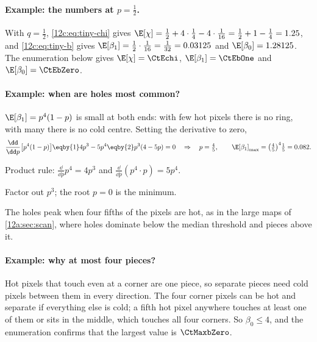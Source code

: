 \paragraph{Example: the numbers at $p=\tfrac12$.} With $q=\tfrac12$, \eqref{12c:eq:tiny-chi} gives
$\E[\chi]=\tfrac12+4\cdot\tfrac14-4\cdot\tfrac1{16}=\tfrac12+1-\tfrac14=1.25$, and \eqref{12c:eq:tiny-b} gives
$\E[\beta_1]=\tfrac12\cdot\tfrac1{16}=\tfrac1{32}=0.03125$ and $\E[\beta_0]=1.28125$. The enumeration below gives
$\E[\chi]=\CtEchi$, $\E[\beta_1]=\CtEbOne$ and $\E[\beta_0]=\CtEbZero$.

\paragraph{Example: when are holes most common?} $\E[\beta_1]=p^4(1-p)$ is small at both ends: with few hot pixels
there is no ring, with many there is no cold centre. Setting the derivative to zero,
\begin{align*}
  \frac{\dd}{\dd p}\bigl[p^4(1-p)\bigr]
  \eqby{1}4p^3-5p^4
  \eqby{2}p^3(4-5p)=0
  \quad\Rightarrow\quad p=\tfrac45,\qquad \E[\beta_1]_{\max}=\bigl(\tfrac45\bigr)^4\tfrac15=0.082 .
\end{align*}
\begin{explain}
  \item Product rule: $\frac{\dd}{\dd p}p^4=4p^3$ and $\frac{\dd}{\dd p}(p^4\cdot p)=5p^4$.
  \item Factor out $p^3$; the root $p=0$ is the minimum.
\end{explain}
The holes peak when four fifths of the pixels are hot, as in the large maps of \cref{12a:sec:scan}, where holes
dominate below the median threshold and pieces above it.

\paragraph{Example: why at most four pieces?} Hot pixels that touch even at a corner are one piece, so separate pieces
need cold pixels between them in every direction. The four corner pixels can be hot and separate if everything else is
cold; a fifth hot pixel anywhere touches at least one of them or sits in the middle, which touches all four corners. So
$\beta_0\le4$, and the enumeration confirms that the largest value is $\CtMaxbZero$.

